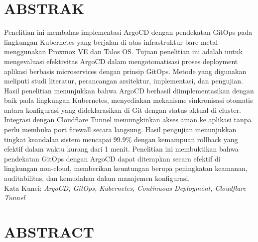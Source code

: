 %
 {}
\chapter*{ABSTRAK}

\begin{singlespace}
	Penelitian ini membahas implementasi ArgoCD dengan pendekatan GitOps pada lingkungan Kubernetes yang berjalan di atas infrastruktur bare-metal menggunakan Proxmox VE dan Talos OS. Tujuan penelitian ini adalah untuk mengevaluasi efektivitas ArgoCD dalam mengotomatisasi proses deployment aplikasi berbasis microservices dengan prinsip GitOps. Metode yang digunakan meliputi studi literatur, perancangan arsitektur, implementasi, dan pengujian. Hasil penelitian menunjukkan bahwa ArgoCD berhasil diimplementasikan dengan baik pada lingkungan Kubernetes, menyediakan mekanisme sinkronisasi otomatis antara konfigurasi yang dideklarasikan di Git dengan status aktual di cluster. Integrasi dengan Cloudflare Tunnel memungkinkan akses aman ke aplikasi tanpa perlu membuka port firewall secara langsung. Hasil pengujian menunjukkan tingkat keandalan sistem mencapai 99.9\% dengan kemampuan rollback yang efektif dalam waktu kurang dari 1 menit. Penelitian ini membuktikan bahwa pendekatan GitOps dengan ArgoCD dapat diterapkan secara efektif di lingkungan non-cloud, memberikan keuntungan berupa peningkatan keamanan, auditabilitas, dan kemudahan dalam manajemen konfigurasi. \\[20pt]
	Kata Kunci: \textit{ArgoCD, GitOps, Kubernetes, Continuous Deployment, Cloudflare Tunnel}
\end{singlespace}

\newpage

 {}
\chapter*{ABSTRACT}

